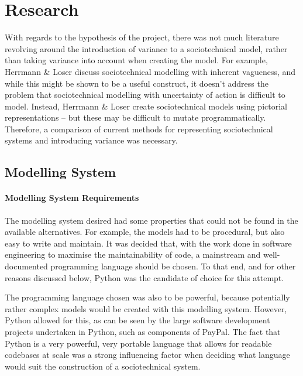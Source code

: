 \chapter{Research}
\label{research_head}
With regards to the hypothesis of the project, there was not much literature revolving around the introduction of variance to a sociotechnical model, rather than taking variance into account when creating the model. For example, Herrmann \& Loser\cite{Herrmann1999} discuss sociotechnical modelling with inherent vagueness, and while this might be shown to be a useful construct, it doesn't address the problem that sociotechnical modelling with uncertainty of action is difficult to model. Instead, Herrmann & Loser create sociotechnical models using pictorial representations -- but these may be difficult to mutate programmatically. Therefore, a comparison of current methods for representing sociotechnical systems and introducing variance was necessary. \par

\section{Modelling System}\label{planning_modelling}
\subsubsection{Modelling System Requirements}\label{planning_modelling_requirements}
The modelling system desired had some properties that could not be found in the available alternatives. For example, the models had to be procedural, but also easy to write and maintain. It was decided that, with the work done in software engineering to maximise the maintainability of code, a mainstream and well-documented programming language should be chosen. To that end, and for other reasons discussed below, Python was the candidate of choice for this attempt. \par

The programming language chosen was also to be powerful, because potentially rather complex models would be created with this modelling system. However, Python allowed for this, as can be seen by the large software development projects undertaken in Python, such as components of PayPal\cite{Enter95:online}. The fact that Python is a very powerful, very portable language that allows for readable codebases at scale was a strong influencing factor when deciding what language would suit the construction of a sociotechnical system. \par%

